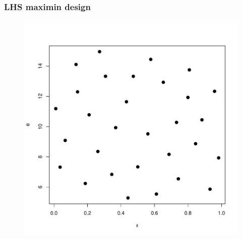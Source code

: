 \documentclass[nopagenumber,9pt]{beamer}
\begin{document}
 
 \begin{frame}
  \frametitle{LHS maximin design}
  \begin{figure}
   \begin{center}
    \includegraphics[scale=.3]{maximin.pdf}
   \end{center}

  \end{figure}

  
 \end{frame}

 
 
\end{document}
